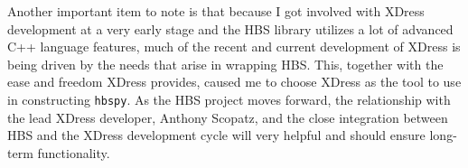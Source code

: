     Another important item to note is that because I got involved with XDress development at a very early stage and the HBS library utilizes a lot of advanced C++ language features, much of the recent and current development of XDress is being driven by the needs that arise in wrapping HBS. This, together with the ease and freedom XDress provides, caused me to choose XDress as the tool to use in constructing \texttt{hbspy}. As the HBS project moves forward, the relationship with the lead XDress developer, Anthony Scopatz, and the close integration between HBS and the XDress development cycle will very helpful and should ensure long-term functionality.
